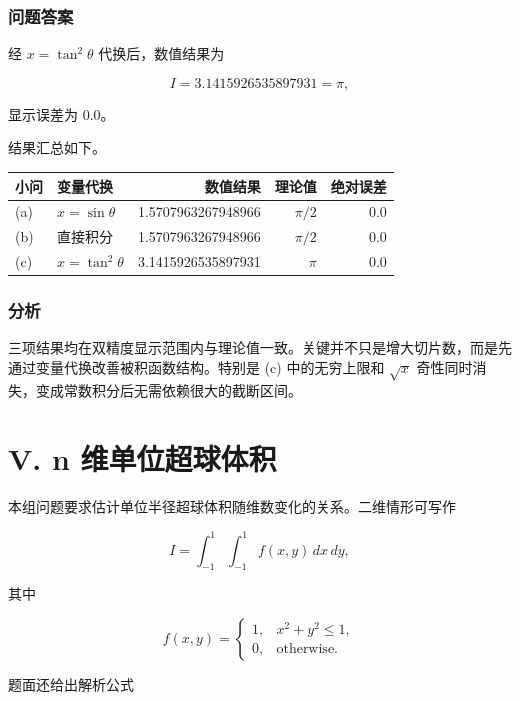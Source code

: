 \documentclass[12pt,a4paper,fontset=none]{ctexart}
\newcounter{none}
\begin{document}
\subsubsection{问题答案}\label{ux95eeux9898ux7b54ux6848-9}

经 \(x=\tan^2\theta\) 代换后，数值结果为

\[
I=3.1415926535897931=\pi,
\]

显示误差为 \(0.0\)。

结果汇总如下。

{\def\LTcaptype{none} %
\begin{longtable}[]{@{}llrrr@{}}
\toprule\noalign{}
小问 & 变量代换 & 数值结果 & 理论值 & 绝对误差 \\
\midrule\noalign{}
\endhead
\bottomrule\noalign{}
\endlastfoot
(a) & \(x=\sin\theta\) & 1.5707963267948966 & \(\pi/2\) & \(0.0\) \\
(b) & 直接积分 & 1.5707963267948966 & \(\pi/2\) & \(0.0\) \\
(c) & \(x=\tan^2\theta\) & 3.1415926535897931 & \(\pi\) & \(0.0\) \\
\end{longtable}
}

\subsubsection{分析}\label{ux5206ux6790-9}

三项结果均在双精度显示范围内与理论值一致。关键并不只是增大切片数，而是先通过变量代换改善被积函数结构。特别是 (c) 中的无穷上限和 \(\sqrt{x}\) 奇性同时消失，变成常数积分后无需依赖很大的截断区间。

\section*{V. n 维单位超球体积}\label{v.-n-ux7ef4ux5355ux4f4dux8d85ux7403ux4f53ux79ef}

本组问题要求估计单位半径超球体积随维数变化的关系。二维情形可写作

\[
I=\int_{-1}^{1}\int_{-1}^{1} f(x,y)\,dx\,dy,
\]

其中

\[
f(x,y)=
\begin{cases}
1, & x^2+y^2\le 1,\\
0, & \text{otherwise}.
\end{cases}
\]

题面还给出解析公式
\end{document}
